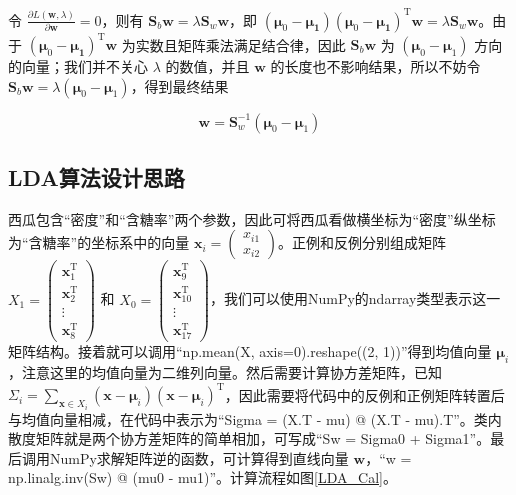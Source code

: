 \documentclass{ctexart}
\begin{document}
	令 $\frac{\partial L(\bm{w},\lambda)}{\partial\bm{w}}=0$，则有 $\mathbf{S}_b\bm{w}=\lambda\mathbf{S}_w\bm{w}$，即 $(\bm{\mu}_0-\bm{\mu_1})(\bm{\mu}_0-\bm{\mu_1})^\mathrm{T}\bm{w}=\lambda\mathbf{S}_w\bm{w}$。由于 $(\bm{\mu}_0-\bm{\mu_1})^\mathrm{T}\bm{w}$ 为实数且矩阵乘法满足结合律，因此 $\mathbf{S}_b\bm{w}$ 为 $(\bm{\mu}_0-\bm{\mu}_1)$ 方向的向量；我们并不关心 $\lambda$ 的数值，并且 $\bm{w}$ 的长度也不影响结果，所以不妨令 $\mathbf{S}_b\bm{w}=\lambda(\bm{\mu}_0-\bm{\mu}_1)$，得到最终结果
	
	\begin{equation}
		\bm{w}=\mathbf{S}_w^{-1}(\bm{\mu}_0-\bm{\mu}_1)
	\end{equation}

	\subsection{LDA算法设计思路}
	\label{LDA_Idea}
	西瓜包含“密度”和“含糖率”两个参数，因此可将西瓜看做横坐标为“密度”纵坐标为“含糖率”的坐标系中的向量 $\bm{x}_i=\begin{pmatrix}x_{i1}\\x_{i2}\end{pmatrix}$。正例和反例分别组成矩阵 $X_1=\begin{pmatrix}\bm{x}_{1}^\mathrm{T}\\\bm{x}_{2}^\mathrm{T}\\\vdots\\\bm{x}_{8}^\mathrm{T}\end{pmatrix}$ 和 $X_0=\begin{pmatrix}\bm{x}_{9}^\mathrm{T}\\\bm{x}_{10}^\mathrm{T}\\\vdots\\\bm{x}_{17}^\mathrm{T}\end{pmatrix}$，我们可以使用NumPy的ndarray类型表示这一矩阵结构。接着就可以调用“np.mean(X, axis=0).reshape((2, 1))”得到均值向量 $\bm{\mu}_i$，注意这里的均值向量为二维列向量。然后需要计算协方差矩阵，已知 $\Sigma_i=\sum\limits_{\bm{x}\in X_i}(\bm{x}-\bm{\mu}_i)(\bm{x}-\bm{\mu}_i)^\mathrm{T}$，因此需要将代码中的反例和正例矩阵转置后与均值向量相减，在代码中表示为“Sigma = (X.T - mu) @ (X.T - mu).T”。类内散度矩阵就是两个协方差矩阵的简单相加，可写成“Sw = Sigma0 + Sigma1”。最后调用NumPy求解矩阵逆的函数，可计算得到直线向量 $\bm{w}$，“w = np.linalg.inv(Sw) @ (mu0 - mu1)”。计算流程如图\ref{LDA_Cal}。
	
\end{document}
